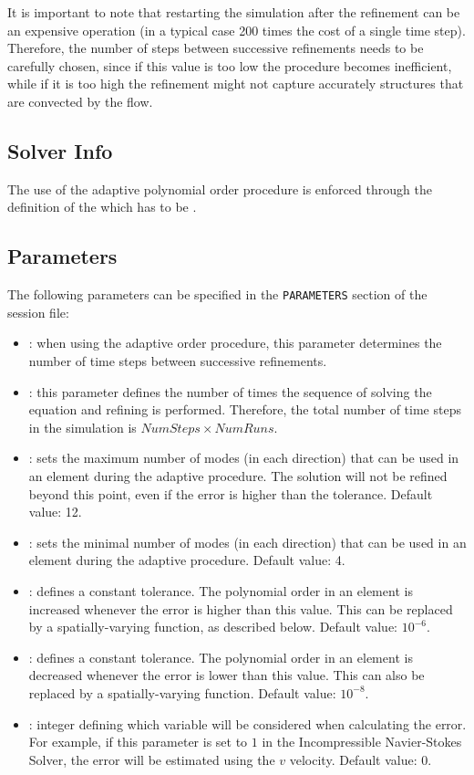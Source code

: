 It is important to note that restarting the simulation after the refinement can be an
expensive operation (in a typical case 200 times the cost of a single time step). Therefore, the number
of steps between successive refinements needs to be carefully chosen, since if this value is too 
low the procedure becomes inefficient, while if it is too high the refinement might not capture
accurately structures that are convected by the flow.  

\subsection{Solver Info}

The use of the adaptive polynomial order procedure
is enforced through the definition of the  which has to be
.

\subsection{Parameters}

The following parameters can be specified in the \texttt{PARAMETERS} section of the session file:

\begin{itemize}
\item {}: when using the adaptive order procedure, this parameter determines
 the number of time steps between successive refinements.
\item {}: this parameter defines the number of times the sequence of solving
 the equation and refining is performed. Therefore,
  the total number of time steps in the simulation is $NumSteps \times NumRuns$.
\item {}: sets the maximum number of modes (in each direction)
 that can be used in an element during the adaptive procedure. The solution will not be
  refined beyond this point, even if the error is higher than the tolerance. Default value: 12.
\item {}: sets the minimal number of modes (in each direction)
 that can be used in an element during the adaptive procedure. Default value: 4.
\item {}: defines a constant tolerance. The polynomial order
 in an element is increased whenever the error is higher than this value. This can be replaced
  by a spatially-varying function, as described below. Default value: $10^{-6}$.
\item {}: defines a constant tolerance. The polynomial order in an
 element is decreased whenever the error is lower than this value. This can also be replaced
  by a spatially-varying function. Default value: $10^{-8}$.
\item {}: integer defining which variable will be considered when calculating
 the error. For example, if this parameter is set to $1$ in the Incompressible Navier-Stokes Solver,
  the error will be estimated using the $v$ velocity. Default value: $0$.
\end{itemize}

